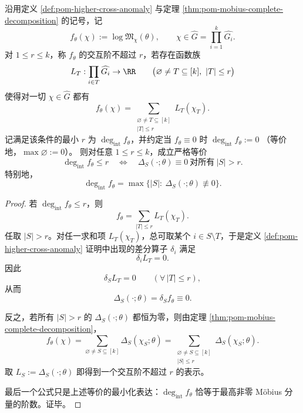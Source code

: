 \begin{theorem}[高阶交叉异常的最小交互阶刻画]\label{thm:xi-time-part62af-cross-anom-interaction-degree}
沿用定义 \ref{def:pom-higher-cross-anomaly} 与定理 \ref{thm:pom-mobius-complete-decomposition} 的记号，记
\[
f_\theta(\chi):=\log\mathfrak{M}_\chi(\theta),
\qquad
\chi\in\widehat G=\prod_{i=1}^{k}\widehat{G_i}.
\]
对 \(1\le r\le k\)，称 \(f_\theta\) 的交互阶不超过 \(r\)，若存在函数族
\[
L_T:\prod_{i\in T}\widehat{G_i}\to\RR
\qquad
\bigl(\varnothing\neq T\subseteq [k],\ |T|\le r\bigr)
\]
使得对一切 \(\chi\in\widehat G\) 都有
\[
f_\theta(\chi)
=
\sum_{\substack{\varnothing\neq T\subseteq [k]\\ |T|\le r}}
L_T(\chi_T).
\]
记满足该条件的最小 \(r\) 为 \(\deg_{\mathrm{int}}f_\theta\)，并约定当
\(
f_\theta\equiv 0
\)
时
\(
\deg_{\mathrm{int}}f_\theta:=0
\)
（等价地，\(\max\varnothing:=0\)）。
则对任意 \(1\le r\le k\)，成立严格等价
\[
\boxed{\;
\deg_{\mathrm{int}}f_\theta\le r
\quad\Longleftrightarrow\quad
\Delta_S(\cdot;\theta)\equiv 0
\ \text{对所有}\ |S|>r.\;}
\]
特别地，
\[
\boxed{\;
\deg_{\mathrm{int}}f_\theta
=
\max\bigl\{|S|:\ \Delta_S(\cdot;\theta)\not\equiv 0\bigr\}.\;}
\]
\end{theorem}
\begin{proof}
若 \(\deg_{\mathrm{int}}f_\theta\le r\)，则
\[
f_\theta=\sum_{|T|\le r}L_T(\chi_T).
\]
任取 \(|S|>r\)。对任一求和项 \(L_T(\chi_T)\)，总可取某个 \(i\in S\setminus T\)，于是定义
\ref{def:pom-higher-cross-anomaly} 证明中出现的差分算子 \(\delta_i\) 满足
\[
\delta_i L_T=0.
\]
因此
\[
\delta_S L_T=0
\qquad
(\forall\,|T|\le r),
\]
从而
\[
\Delta_S(\cdot;\theta)=\delta_S f_\theta\equiv 0.
\]

反之，若所有 \(|S|>r\) 的 \(\Delta_S(\cdot;\theta)\) 都恒为零，则由定理
\ref{thm:pom-mobius-complete-decomposition}，
\[
f_\theta(\chi)
=
\sum_{\varnothing\neq S\subseteq [k]}\Delta_S(\chi_S;\theta)
=
\sum_{\substack{\varnothing\neq S\subseteq [k]\\ |S|\le r}}
\Delta_S(\chi_S;\theta).
\]
取 \(L_S:=\Delta_S(\cdot;\theta)\) 即得到一个交互阶不超过 \(r\) 的表示。

最后一个公式只是上述等价的最小化表达：\(\deg_{\mathrm{int}}f_\theta\) 恰等于最高非零 Möbius 分量的阶数。证毕。
\end{proof}

